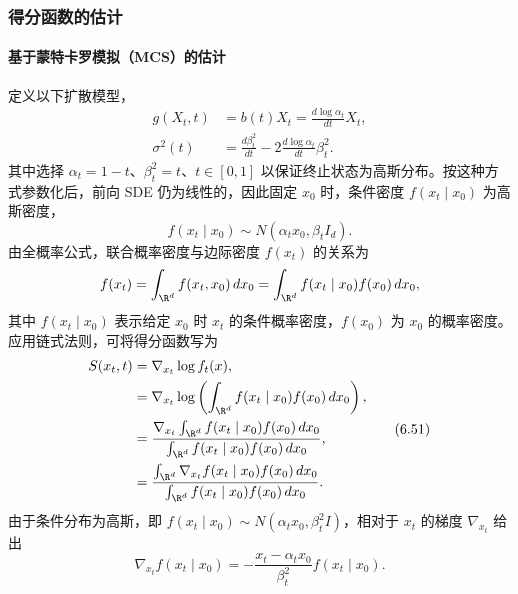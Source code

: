 \subsubsection{得分函数的估计}

\paragraph{基于蒙特卡罗模拟（MCS）的估计}

定义以下扩散模型，
\begin{equation*}
  \begin{aligned}
   g(X_t,t)&=b(t)X_t=\frac{d\log\alpha_t}{dt}X_t,\\
   \sigma^2(t)&=\frac{d\beta_t^2}{dt}-2\frac{d\log\alpha_t}{dt}\beta_t^2.
  \end{aligned}
  \tag{6.49}\label{eq:6.49}
\end{equation*}
其中选择 $\alpha_t=1-t$、$\beta_t^2=t$、$t\in[0,1]$ 以保证终止状态为高斯分布。按这种方式参数化后，前向 SDE 仍为线性的，因此固定 $x_0$ 时，条件密度 $f(x_t\mid x_0)$ 为高斯密度，
\begin{equation*}
  f(x_t\mid x_0)\sim N(\alpha_t x_0,\beta_t I_d).
  \tag{6.50}\label{eq:6.50}
\end{equation*}
由全概率公式，联合概率密度与边际密度 $f(x_t)$ 的关系为
\[
  f(x_t)=\int_{\R^d}f(x_t,x_0)\,dx_0
        =\int_{\R^d}f(x_t\mid x_0)f(x_0)\,dx_0,
\]
其中 $f(x_t\mid x_0)$ 表示给定 $x_0$ 时 $x_t$ 的条件概率密度，$f(x_0)$ 为 $x_0$ 的概率密度。应用链式法则，可将得分函数写为
\begin{equation*}
  \begin{aligned}
  S(x_t,t)&=\nabla_{x_t}\log f_t(x),\\
    &=\nabla_{x_t}\log\left(\int_{\R^d} f(x_t\mid x_0)f(x_0)\,dx_0\right),\\
    &=\frac{\nabla_{x_t}\int_{\R^d} f(x_t\mid x_0)f(x_0)\,dx_0}
            {\int_{\R^d} f(x_t\mid x_0)f(x_0)\,dx_0},\\
    &=\frac{\int_{\R^d} \nabla_{x_t} f(x_t\mid x_0)f(x_0)\,dx_0}
            {\int_{\R^d} f(x_t\mid x_0)f(x_0)\,dx_0}.
  \end{aligned}
  \tag{6.51}\label{eq:6.51}
\end{equation*}
由于条件分布为高斯，即 $f(x_t\mid x_0)\sim N(\alpha_t x_0,\beta_t^2 I)$，相对于 $x_t$ 的梯度 $\nabla_{x_t}$ 给出
\begin{equation*}
  \nabla_{x_t}f(x_t\mid x_0)
  =-\frac{x_t-\alpha_t x_0}{\beta_t^2}f(x_t\mid x_0).
  \tag{6.52}\label{eq:6.52}
\end{equation*}
